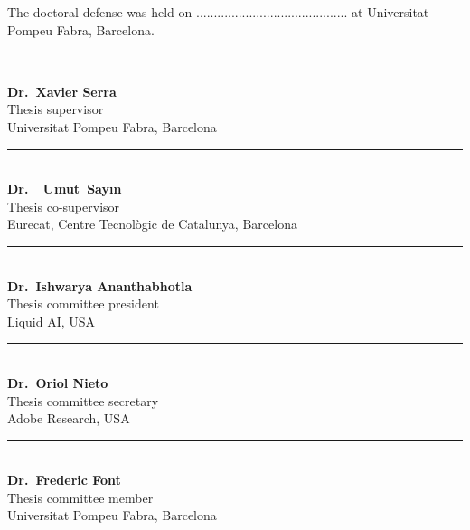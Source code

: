 The doctoral defense was held on ........................................... at Universitat Pompeu Fabra, Barcelona. 

\begin{center}
    \vspace*{1cm}
    \rule{6cm}{0.4pt}\\
    \textbf{Dr.~Xavier Serra}\\
    Thesis supervisor\\
    Universitat Pompeu Fabra, Barcelona\\
    \vspace*{1.6cm}

    \rule{6cm}{0.4pt}\\
    \textbf{Dr.~~Umut~Say\i n}\\
    Thesis co-supervisor\\
    Eurecat, Centre Tecnològic de Catalunya, Barcelona\\
    \vspace*{1.6cm}

    \rule{6cm}{0.4pt}\\
    \textbf{Dr.~Ishwarya Ananthabhotla}\\
    Thesis committee president\\
    Liquid AI, USA\\
    \vspace*{1.6cm}

    \rule{6cm}{0.4pt}\\
    \textbf{Dr.~Oriol Nieto}\\
    Thesis committee secretary\\
    Adobe Research, USA\\
    \vspace*{1.6cm}

    \rule{6cm}{0.4pt}\\
    \textbf{Dr.~Frederic Font}\\
    Thesis committee member\\
    Universitat Pompeu Fabra, Barcelona\\
\end{center}